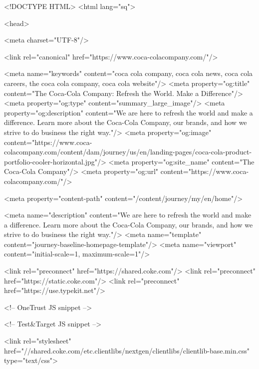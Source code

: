 
<!DOCTYPE HTML>
<html lang="sq">







<head>
    

    <meta charset="UTF-8"/>
    
    
    
    
    <link rel="canonical" href="https://www.coca-colacompany.com/"/>
    
    
    <meta name="keywords" content="coca cola company, coca cola news, coca cola careers, the coca cola company, coca cola website"/>
    <meta property="og:title" content="The Coca-Cola Company: Refresh the World.  Make a Difference"/>
    <meta property="og:type" content="summary_large_image"/>
    <meta property="og:description" content="We are here to refresh the world and make a difference. Learn more about the Coca-Cola Company, our brands, and how we strive to do business the right way."/>
    <meta property="og:image" content="https://www.coca-colacompany.com/content/dam/journey/us/en/landing-pages/coca-cola-product-portfolio-cooler-horizontal.jpg"/>
    <meta property="og:site_name" content="The Coca-Cola Company"/>
    <meta property="og:url" content="https://www.coca-colacompany.com/"/>
    
    <meta property="content-path" content="/content/journey/my/en/home"/>
	
    <meta name="description" content="We are here to refresh the world and make a difference. Learn more about the Coca-Cola Company, our brands, and how we strive to do business the right way."/>
    <meta name="template" content="journey-baseline-homepage-template"/>
    <meta name="viewport" content="initial-scale=1, maximum-scale=1"/>
    
        
        <link rel="preconnect" href="https://shared.coke.com"/>
        <link rel="preconnect" href="https://static.coke.com"/>
        <link rel="preconnect" href="https://use.typekit.net"/>
    
    
    
    <!-- OneTrust JS snippet -->
        
    
    
        
    
    
    <!-- Test&Target JS snippet -->
        
    
    

    

    
<link rel="stylesheet" href="//shared.coke.com/etc.clientlibs/nextgen/clientlibs/clientlib-base.min.css" type="text/css">




